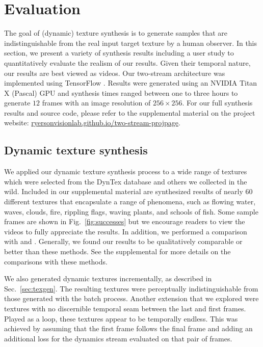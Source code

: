 

\chapter{Evaluation }\label{empirical_evaluation}

The goal of (dynamic) texture synthesis is to generate 
samples that are indistinguishable from the real input target
texture by a human observer.
In this section, we present a variety of synthesis results
including a user study to quantitatively evaluate the realism
of our results.
Given their temporal nature, our results are best viewed as 
videos.
Our two-stream architecture was implemented using TensorFlow
\cite{tabadi2015tensorflowlong}.
Results were generated using an NVIDIA Titan X (Pascal) GPU
and synthesis times ranged between one to three hours 
to generate $12$ frames with an image resolution of 
$256 \times 256$.
For our full synthesis results and source code, please refer to the
supplemental material on the project website: \url{ryersonvisionlab.github.io/two-stream-projpage}.

\section{Dynamic texture synthesis}\label{eval_dynamictexturesynthesis}

We applied our dynamic texture synthesis process 
to a wide range of textures which were selected from the 
DynTex \cite{peteri2010} database and others we collected in
the wild.
Included in our supplemental material are synthesized results
of nearly 60 different textures that encapsulate a range of
phenomena, such as flowing water, waves, clouds, fire, rippling
flags, waving plants, and schools of fish.
Some sample frames are shown in Fig.\ \ref{fig:successes}
but we encourage readers to view the videos to fully appreciate
the results.
In addition, we performed a comparison with \cite{funke2017} and 
\cite{xie2017synthesizing}.
Generally, we found our results to be qualitatively comparable or better than
these methods.
See the supplemental for more details on the comparisons with these methods.

We also generated dynamic textures incrementally, as described in
Sec.\ \ref{sec:texgen}.
The resulting textures were perceptually indistinguishable from those
generated with the batch process.
Another extension that we explored were textures with no 
discernible temporal seam between the last and first frames.
Played as a loop, these textures appear to be temporally endless.
This was achieved by assuming that the first frame follows the
final frame and adding an additional loss for the dynamics 
stream evaluated on that pair of frames.

